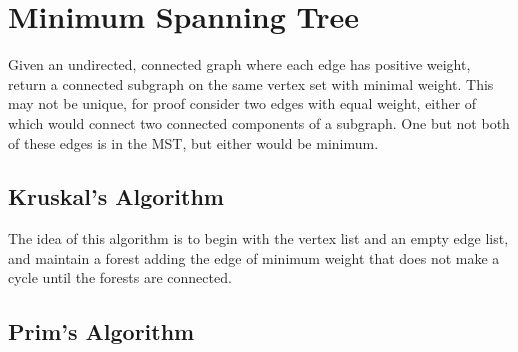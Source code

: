 \chapter{Minimum Spanning Tree}

Given an undirected, connected graph where each edge has positive
weight, return a connected subgraph on the same vertex set with
minimal weight.  This may not be unique, for proof consider two edges
with equal weight, either of which would connect two connected
components of a subgraph.  One but not both of these edges is in the
MST, but either would be minimum.

\section{Kruskal's Algorithm}

The idea of this algorithm is to begin with the vertex list and an
empty edge list, and maintain a forest adding the edge of minimum
weight that does not make a cycle until the forests are connected.

\section{Prim's Algorithm}

